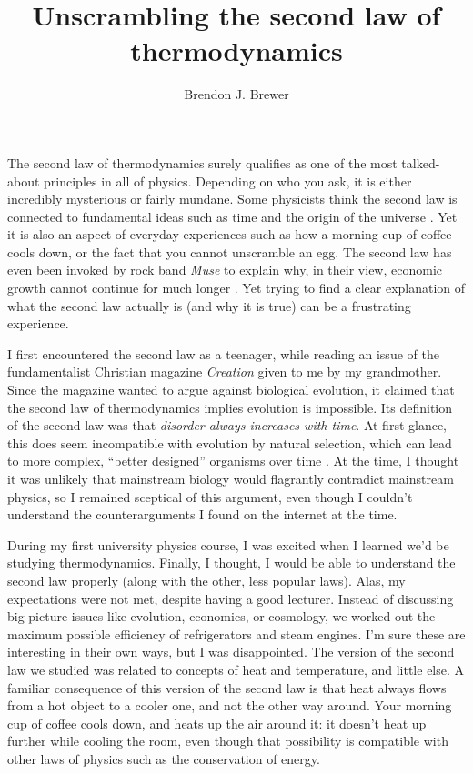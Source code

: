 \documentclass[a4paper, 12pt]{article}
\title{Unscrambling the second law of thermodynamics}
\author{Brendon J. Brewer}
\begin{document}
\sffamily
\maketitle

The second law of thermodynamics surely qualifies as one of the most
talked-about principles in all of physics. Depending on who you ask, it is
either incredibly mysterious or fairly mundane. Some physicists think
the second law is connected to
fundamental ideas such as time and the origin of the universe
\citep{carroll}. Yet it is also an aspect of everyday experiences
such as how a morning cup of coffee cools down,
or the fact that you cannot unscramble an egg.
The second law has even been invoked by rock band {\em Muse} to
explain why, in their
view, economic growth cannot continue for much longer \citep{muse}.
Yet trying to find a clear explanation of what the second law actually is
(and why it is true) can be a frustrating experience.

I first encountered the second law
as a teenager, while reading an issue of the fundamentalist Christian magazine
{\em Creation} given to me by my grandmother. Since the magazine wanted to
argue against biological evolution, it claimed that the second law of
thermodynamics implies evolution is impossible. Its definition of the second
law was that {\em disorder always increases with time}.
At first glance, this does seem incompatible with evolution by
natural selection, which can lead to more complex,
``better designed'' organisms over time \citep{dawkins}.
At the time, I thought it was unlikely that mainstream biology would flagrantly
contradict mainstream physics, so I remained sceptical of this argument,
even though I couldn't understand the counterarguments I found on the
internet at the time.

During my first university physics course, I was excited when I learned
we'd be
studying thermodynamics. Finally, I thought, I would be able to understand the
second law properly (along with the other, less popular laws).
Alas, my expectations were not met, despite having a good lecturer.
Instead of discussing big picture issues like evolution, economics, or
cosmology, we
worked out the maximum possible efficiency of refrigerators and steam engines.
I'm sure these are interesting in their own ways, but I was disappointed.
The version of the second law we studied was related to concepts of heat
and temperature, and little else.
A familiar consequence of this version of the second law is that
heat always flows from a hot object to a cooler
one, and not the other way around. Your morning
cup of coffee cools down, and heats up the air around it: it doesn't heat
up further while cooling the room, even though that possibility is compatible
with other laws of physics such as the conservation of energy.
\end{document}
